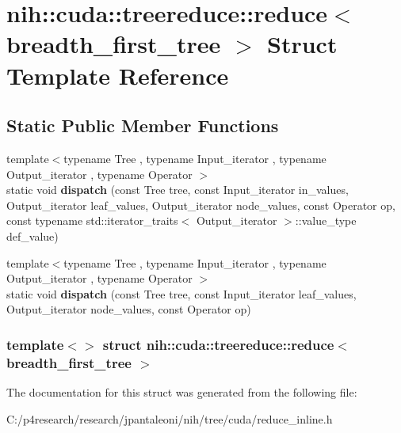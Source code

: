 \hypertarget{structnih_1_1cuda_1_1treereduce_1_1reduce_3_01breadth__first__tree_01_4}{
\section{nih\-:\-:cuda\-:\-:treereduce\-:\-:reduce$<$ breadth\-\_\-first\-\_\-tree $>$ \-Struct \-Template \-Reference}
\label{structnih_1_1cuda_1_1treereduce_1_1reduce_3_01breadth__first__tree_01_4}
}
\subsection*{\-Static \-Public \-Member \-Functions}
\begin{DoxyCompactItemize}
\item 
\hypertarget{structnih_1_1cuda_1_1treereduce_1_1reduce_3_01breadth__first__tree_01_4_ac1e6681e368fab2d922f9437cb0943a2}{
{\footnotesize template$<$typename Tree , typename Input\-\_\-iterator , typename Output\-\_\-iterator , typename Operator $>$ }\\static void {\bfseries dispatch} (const \-Tree tree, const \-Input\-\_\-iterator in\-\_\-values, \-Output\-\_\-iterator leaf\-\_\-values, \-Output\-\_\-iterator node\-\_\-values, const \-Operator op, const typename std\-::iterator\-\_\-traits$<$ \-Output\-\_\-iterator $>$\-::value\-\_\-type def\-\_\-value)}
\label{structnih_1_1cuda_1_1treereduce_1_1reduce_3_01breadth__first__tree_01_4_ac1e6681e368fab2d922f9437cb0943a2}

\item 
\hypertarget{structnih_1_1cuda_1_1treereduce_1_1reduce_3_01breadth__first__tree_01_4_a58629a837caf48b1519b85fae3c18051}{
{\footnotesize template$<$typename Tree , typename Input\-\_\-iterator , typename Output\-\_\-iterator , typename Operator $>$ }\\static void {\bfseries dispatch} (const \-Tree tree, const \-Input\-\_\-iterator leaf\-\_\-values, \-Output\-\_\-iterator node\-\_\-values, const \-Operator op)}
\label{structnih_1_1cuda_1_1treereduce_1_1reduce_3_01breadth__first__tree_01_4_a58629a837caf48b1519b85fae3c18051}

\end{DoxyCompactItemize}
\subsubsection*{template$<$$>$ struct nih\-::cuda\-::treereduce\-::reduce$<$ breadth\-\_\-first\-\_\-tree $>$}



\-The documentation for this struct was generated from the following file\-:\begin{DoxyCompactItemize}
\item 
\-C\-:/p4research/research/jpantaleoni/nih/tree/cuda/reduce\-\_\-inline.\-h\end{DoxyCompactItemize}
